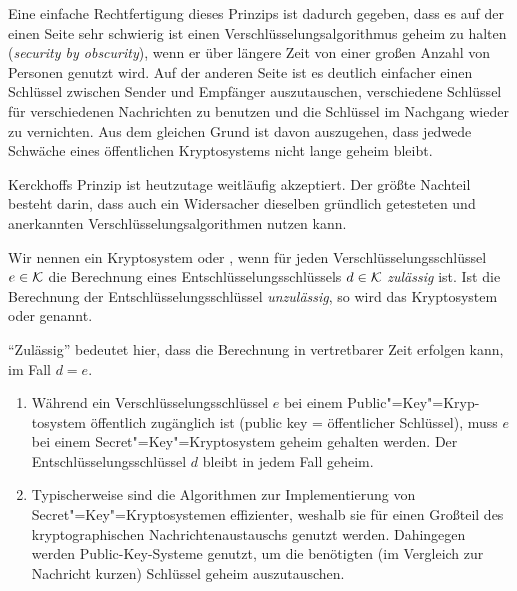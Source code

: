 Eine einfache Rechtfertigung dieses Prinzips ist dadurch gegeben, dass es auf der einen Seite sehr schwierig ist einen Verschlüsselungsalgorithmus geheim zu halten (\emph{security by obscurity}), wenn er über längere Zeit von einer großen Anzahl von Personen genutzt wird. Auf der anderen Seite ist es deutlich einfacher einen Schlüssel zwischen Sender und Empfänger auszutauschen, verschiedene Schlüssel für verschiedenen Nachrichten zu benutzen und die Schlüssel im Nachgang wieder zu vernichten. Aus dem gleichen Grund ist davon auszugehen, dass jedwede Schwäche eines öffentlichen Kryptosystems nicht lange geheim bleibt.

Kerckhoffs Prinzip ist heutzutage weitläufig akzeptiert. Der größte Nachteil besteht darin, dass auch ein Widersacher dieselben gründlich getesteten und anerkannten Verschlüsselungsalgorithmen nutzen kann.

\begin{definition}[Secret-Key- und Public"=Key"=Kryptosysteme]
 Wir nennen ein Kryptosystem  oder , wenn für jeden Verschlüsselungsschlüssel $e \in \mathcal K$ die Berechnung eines Entschlüsselungsschlüssels $d \in \mathcal K$ \emph{zulässig} ist. Ist die Berechnung der Entschlüsselungsschlüssel \emph{unzulässig}, so wird das Kryptosystem  oder  genannt.
 
 \enquote{Zulässig} bedeutet hier, dass die Berechnung in vertretbarer Zeit erfolgen kann, \zB im Fall $d=e$.
\end{definition}

\begin{remark}
 \begin{enumerate}
  \item Während ein Verschlüsselungsschlüssel $e$ bei einem Public"=Key"=Kryp-tosystem öffentlich zugänglich ist (public key = öffentlicher Schlüssel), muss $e$ bei einem Secret"=Key"=Kryptosystem geheim gehalten werden. Der Entschlüsselungsschlüssel $d$ bleibt in jedem Fall geheim.
  \item Typischerweise sind die Algorithmen zur Implementierung von Secret"=Key"=Kryptosystemen effizienter, weshalb sie für einen Großteil des kryptographischen Nachrichtenaustauschs genutzt werden. Dahingegen werden Public-Key-Systeme genutzt, um die benötigten (im Vergleich zur Nachricht kurzen) Schlüssel geheim auszutauschen.
 \end{enumerate}

\end{remark}

